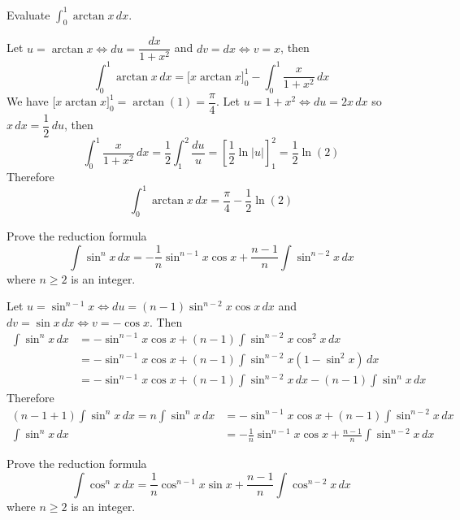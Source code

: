 \begin{problem}
    Evaluate \(\displaystyle{\int_0^1\arctan x\,dx}\).
\end{problem}
\begin{solution}
    Let \(u=\arctan x\iff du=\dfrac{dx}{1+x^2}\) and \(dv=dx\iff v=x\), then
    \[\int_0^1\arctan x\,dx
    =\big[x\arctan x\big]_0^1-\int_0^1\frac{x}{1+x^2}\,dx\]
    We have \(\big[x\arctan x\big]_0^1=\arctan(1)=\dfrac{\pi}{4}\).
    Let \(u=1+x^2\iff du=2x\,dx\) so \(x\,dx=\dfrac{1}{2}\,du\), then
    \[\int_0^1\frac{x}{1+x^2}\,dx=\frac{1}{2}\int_1^2\frac{du}{u}
    =\left[\frac{1}{2}\ln|u|\right]_1^2=\frac{1}{2}\ln(2)\]
    Therefore
    \[\int_0^1\arctan x\,dx=\frac{\pi}{4}-\frac{1}{2}\ln(2)\]
\end{solution}
\begin{problem}
    Prove the reduction formula
    \[\int\sin^n x\,dx
    =-\frac{1}{n}\sin^{n-1}x\cos x+\frac{n-1}{n}\int\sin^{n-2}x\,dx\]
    where \(n\geq 2\) is an integer.
\end{problem}
\begin{solution}
    Let \(u=\sin^{n-1}x\iff du=(n-1)\sin^{n-2}x\cos x\,dx\) and \\
    \(dv=\sin x\,dx\iff v=-\cos x\).
    Then
    \begin{align*}
        \int\sin^n x\,dx
        &= -\sin^{n-1}x\cos x+(n-1)\int \sin^{n-2}x\cos^2 x\,dx \\
        &= -\sin^{n-1}x\cos x+(n-1)\int \sin^{n-2}x(1-\sin^2 x)\,dx \\
        &= -\sin^{n-1}x\cos x+(n-1)\int \sin^{n-2}x\,dx-(n-1)\int\sin^n x\,dx
    \end{align*}
    Therefore
    \begin{align*}
        (n-1+1)\int\sin^n x\,dx=n\int\sin^n x\,dx
        &= -\sin^{n-1}x\cos x+(n-1)\int \sin^{n-2}x\,dx \\
        \int\sin^n x\,dx
        &= -\frac{1}{n}\sin^{n-1}x\cos x
        +\frac{n-1}{n}\int\sin^{n-2}x\,dx 
    \end{align*}
\end{solution}
\begin{problem}
    Prove the reduction formula
    \[\int\cos^n x\,dx
    =\frac{1}{n}\cos^{n-1}x\sin x+\frac{n-1}{n}\int\cos^{n-2}x\,dx\]
    where \(n\geq 2\) is an integer.
\end{problem}
